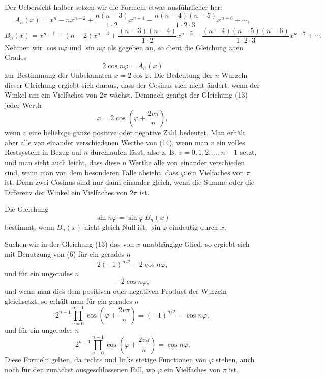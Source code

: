 \documentclass[11pt]{article}
\begin{document}
Der Uebersicht halber setzen wir die Formeln etwas ausführlicher her:
\[
\tag{11}       A_n(x)=x^n-nx^{n-2}+\frac{n(n-3)}{1\cdot2}x^{n-4}
-\frac{n(n-4)(n-5)}{1\cdot2\cdot3}x^{n-6}+\cdots,
\]
\[
\tag{12}       B_n(x)=x^{n-1}-(n-2)x^{n-3}
+\frac{(n-3)(n-4)}{1\cdot2}x^{n-5}
-\frac{(n-4)(n-5)(n-6)}{1\cdot2\cdot3}x^{n-7}+\cdots.
\]
Nehmen wir $\cos n\varphi$ und $\sin n\varphi$ als gegeben an, so dient die Gleichung $n$ten Grades
\[
\tag{13}       2\cos n\varphi=A_n(x)
\]
zur Bestimmung der Unbekannten $x=2\cos\varphi$. Die Bedeutung der $n$ Wurzeln dieser Gleichung ergiebt sich daraus, dass der Cosinus sich nicht ändert, wenn der Winkel um ein Vielfaches von $2\pi$ wächst. Demnach genügt der Gleichung (13) jeder Werth
\[
\tag{14}       x=2\cos\left(\varphi+\frac{2v\pi}{n}\right),
\]
wenn $v$ eine beliebige ganze positive oder negative Zahl bedeutet. Man erhält aber alle von einander verschiedenen Werthe von (14), wenn man $v$ ein volles Restsystem in Bezug auf $n$ durchlaufen lässt, also z. B. $v=0,1,2,\ldots,n-1$ setzt, und man sieht auch leicht, dass diese $n$ Werthe alle von einander verschieden sind, wenn man von dem besonderen Falle absieht, dass $\varphi$ ein Vielfaches von $\pi$ ist. Denn zwei Cosinus sind nur dann einander gleich, wenn die Summe oder die Differenz der Winkel ein Vielfaches von $2\pi$ ist.

Die Gleichung
\[
\tag{15}       \sin n\varphi=\sin\varphi\,B_n(x)
\]
bestimmt, wenn $B_n(x)$ nicht gleich Null ist, $\sin\varphi$ eindeutig durch $x$.

Suchen wir in der Gleichung (13) das von $x$ unabhängige Glied, so ergiebt sich mit Benutzung von (6) für ein gerades $n$
\[
        2(-1)^{n/2}-2\cos n\varphi,
\]
und für ein ungerades $n$
\[
        -2\cos n\varphi,
\]
und wenn man dies dem positiven oder negativen Product der Wurzeln gleichsetzt, so erhält man für ein gerades $n$
\[
\tag{16}       2^{n-1}\prod_{v=0}^{n-1}\cos\left(\varphi+\frac{2v\pi}{n}\right)
        =(-1)^{n/2}-\cos n\varphi,
\]
und für ein ungerades $n$
\[
\tag{17}       2^{n-1}\prod_{v=0}^{n-1}\cos\left(\varphi+\frac{2v\pi}{n}\right)
        =\cos n\varphi.
\]
Diese Formeln gelten, da rechts und links stetige Functionen von $\varphi$ stehen, auch noch für den zunächst ausgeschlossenen Fall, wo $\varphi$ ein Vielfaches von $\pi$ ist.
\end{document}
